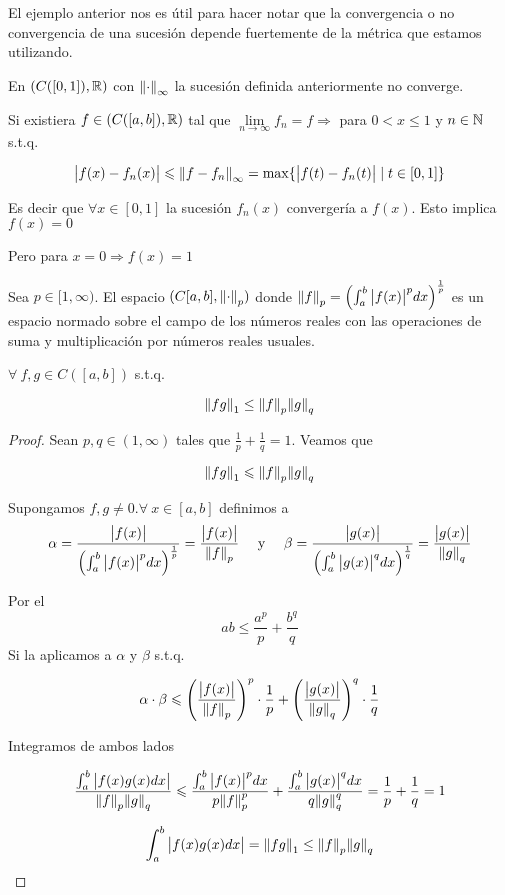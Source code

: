 \begin{remark}
    El ejemplo anterior nos es útil para hacer notar que la convergencia o no convergencia de una sucesión depende fuertemente de la métrica que estamos utilizando. 

    En $(C([0,1]),\mathbb{R})$ con $\norm{\cdot}_\infty$ la sucesión definida anteriormente no converge.

    Si existiera $f \in (C([a,b]),\mathbb{R})$ tal que $\lim\limits_{n \to \infty} f_n = f \Rightarrow$ para $0 < x \leqslant 1$ y $n \in \mathbb{N}$ s.t.q.

    $$ \abs{f(x)-f_n(x)} \leqslant \norm{f-f_n}_\infty = \max \{ \abs{f(t)-f_n(t)} \mid t \in [0,1] \}$$

    Es decir que $\forall x \in [0,1]$ la sucesión $f_n(x)$ convergería a $f(x)$. Esto implica $f(x) = 0$

    Pero para $x=0 \Rightarrow f(x) = 1$
\end{remark}

\begin{theorem} \label{theom2213}
    Sea $p \in [1,\infty)$. El espacio $(C[a,b],{\norm{\cdot}}_{p})$ donde ${\norm{f}}_{p} = {\left( \int_{a}^{b} {\abs{f(x)}}^{p} dx \right)}^{\frac{1}{p}}$ es un espacio normado sobre el campo de los números reales con las operaciones de suma y multiplicación por números reales usuales.
\end{theorem}

\begin{lemma}
    $\forall \: f,g \in C([a,b])$ s.t.q.
    
    $$\norm{fg}_1 \leq \norm{f}_p \norm{g}_q$$
\end{lemma}
\begin{proof}
    Sean $p,q \in (1,\infty)$ tales que $\frac{1}{p} + \frac{1}{q} = 1$. Veamos que
    
    $$ \norm{fg}_1 \leqslant \norm{f}_p \norm{g}_q$$
    
    Supongamos $f,g \neq 0. \forall \: x \in [a,b]$ definimos a 
    \begin{align*}
       \alpha = \frac{\abs{f(x)}}{{\left( \int_{a}^{b} {\abs{f(x)}}^{p} dx \right)}^{\frac{1}{p}}} = \frac{\abs{f(x)}}{\norm{f}_p} && \text{ y } && \beta = \frac{\abs{g(x)}}{{\left( \int_{a}^{b} {\abs{g(x)}}^{q} dx \right)}^{\frac{1}{q}}} = \frac{\abs{g(x)}}{\norm{g}_q}
    \end{align*}
    
    Por el  $$ab \leqslant \frac{a^p}{p} + \frac{b^q}{q}$$ Si la aplicamos a $\alpha$ y $\beta$ s.t.q.

    $$\alpha \cdot \beta \leqslant \left( \frac{\abs{f(x)}}{\norm{f}_p} \right)^p \cdot \frac{1}{p} + \left( \frac{\abs{g(x)}}{\norm{g}_q} \right)^q \cdot \frac{1}{q}$$

    Integramos de ambos lados

    $$\frac{\int_{a}^{b}\abs{f(x)g(x)dx}}{\norm{f}_p \norm{g}_q} \leqslant \frac{\int_{a}^{b}{\abs{f(x)}}^{p}dx}{p{\norm{f}}^{p}_{p}}+\frac{\int_{a}^{b}{\abs{g(x)}}^{q}dx}{q{\norm{g}}^{q}_{q}} = \frac{1}{p} + \frac{1}{q} = 1$$

    $$\int_{a}^{b}\abs{f(x)g(x)dx} = \norm{fg}_1 \leq \norm{f}_p \norm{g}_q$$    
\end{proof}

